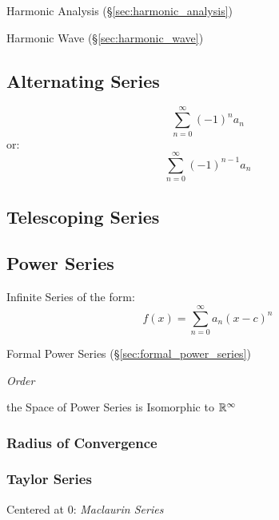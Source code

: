 \fist Harmonic Analysis (\S\ref{sec:harmonic_analysis})

\fist Harmonic Wave (\S\ref{sec:harmonic_wave})



\subsection{Alternating Series}\label{sec:alternating_series}

\[
  \sum_{n=0}^\infty (-1)^n a_n
\]
or:
\[
  \sum_{n=0}^\infty (-1)^{n-1} a_n
\]



\subsection{Telescoping Series}\label{sec:telescoping_series}

\subsection{Power Series}\label{sec:power_series}

Infinite Series of the form:
\[
  f(x) = \sum_{n=0}^\infty a_n (x - c)^n
\]

\fist Formal Power Series (\S\ref{sec:formal_power_series})

\emph{Order}

the Space of Power Series is Isomorphic to $\mathbb{R}^\infty$



\subsubsection{Radius of Convergence}\label{sec:radius_of_convergence}

\subsubsection{Taylor Series}\label{sec:taylor_series}

Centered at $0$: \emph{Maclaurin Series}

